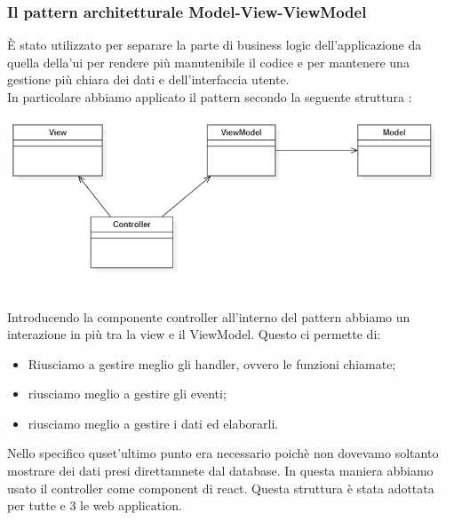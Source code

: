 \subsubsection{Il pattern architetturale Model-View-ViewModel}
È stato utilizzato per separare la parte di business logic dell'applicazione da quella della'ui per rendere più manutenibile il codice e per mantenere una gestione più chiara dei dati e dell'interfaccia utente. \\
In particolare abbiamo applicato il pattern secondo la seguente struttura : 

\begin{center}
    \includegraphics[scale = 0.4]{./res/img/MVVM.png}
  \end{center}
  
Introducendo la componente controller all'interno del pattern abbiamo un interazione in più tra la view e il ViewModel. Questo ci permette di:
\begin{itemize}
    \item Riusciamo a gestire meglio gli handler, ovvero le funzioni chiamate;
    \item riusciamo meglio a gestire gli eventi;
    \item riusciamo meglio a gestire i dati ed elaborarli.
\end{itemize}

Nello specifico quset'ultimo punto era necessario poichè non dovevamo soltanto mostrare dei dati presi direttamnete dal database. In questa maniera abbiamo usato il controller come component di react. Questa struttura è stata adottata per tutte e 3 le web application. 